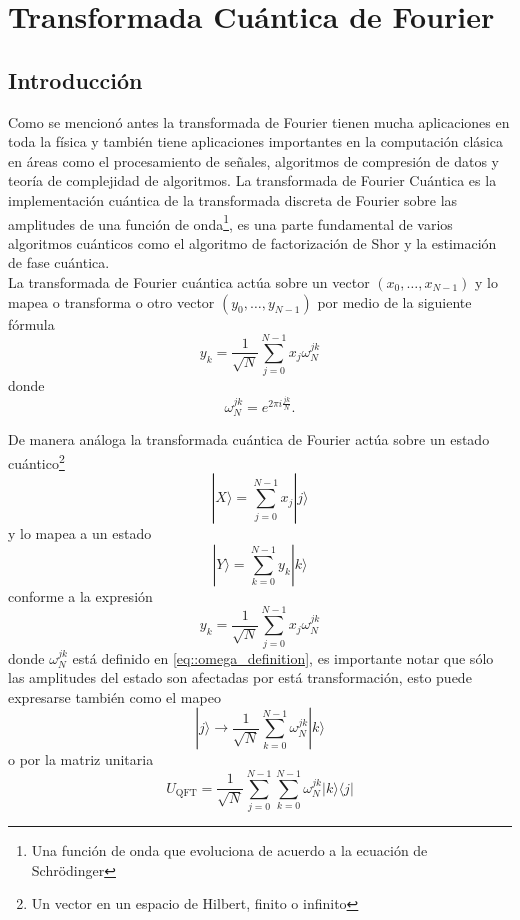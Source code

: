 \documentclass[a4paper]{article}
\begin{document}
\section{Transformada Cuántica de Fourier}
\subsection{Introducción}
Como se mencionó antes la transformada de Fourier tienen mucha aplicaciones en toda la física y también tiene aplicaciones importantes en la computación clásica en áreas como el procesamiento de señales, algoritmos de compresión de datos y teoría de complejidad de algoritmos. La transformada de Fourier Cuántica es la implementación cuántica de la transformada discreta de Fourier sobre las amplitudes de una función de onda\footnote{Una función de onda que evoluciona de acuerdo a la ecuación de Schr\"{o}dinger}, es una parte fundamental de varios algoritmos cuánticos  como el algoritmo de factorización de Shor y la estimación de fase cuántica.\\
La transformada de Fourier cuántica actúa sobre un vector $(x_0, \hdots, x_{N-1})$ y lo mapea o transforma o otro vector
$(y_0, \hdots, y_{N-1})$ por medio de la siguiente fórmula
\begin{equation}
y_{k}=\frac{1}{\sqrt{N}}\sum_{j=0}^{N-1}x_j \omega_{N}^{jk}
\end{equation}
donde 
\begin{equation}\label{eq::omega_definition}
\omega_{N}^{jk}=e^{2\pi i \frac{jk}{N}}.
\end{equation}

De manera análoga la transformada cuántica de Fourier actúa sobre un estado cuántico\footnote{Un vector en un espacio de Hilbert, finito o infinito} 
\begin{equation}
|X\rangle=\sum_{j=0}^{N-1} x_{j}|j\rangle
\end{equation}
y lo mapea a un estado 
\begin{equation}\label{eq::QFT_general}
|Y\rangle=\sum_{k=0}^{N-1} y_{k}|k\rangle
\end{equation}
conforme a la expresión
\begin{equation}
y_k=\frac{1}{\sqrt{N}}\sum_{j=0}^{N-1}x_j\omega_{N}^{jk}
\end{equation}
donde $\omega_{N}^{jk}$ está definido en \ref{eq::omega_definition}, es importante notar que sólo las amplitudes del estado son afectadas por está transformación, esto puede expresarse también como el mapeo
\begin{equation}
|j\rangle \rightarrow \frac{1}{\sqrt{N}}\sum^{N-1}_{k=0}\omega_N^{jk}|k\rangle
\end{equation}
o por la matriz unitaria
\begin{equation}
U_{\text{QFT}}=\frac{1}{\sqrt{N}}\sum_{j=0}^{N-1}\sum_{k=0}^{N-1}\omega_{N}^{jk}|k\rangle\langle j|
\end{equation}
\end{document}
